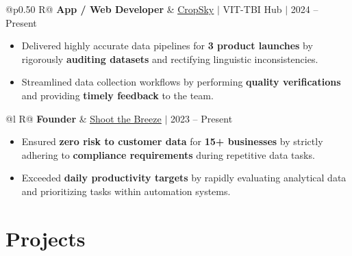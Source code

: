 \documentclass[a4paper,10pt]{article}
\newcommand{\ulink}[2]{\href{#1}{\uline{#2}}}
\newcommand{\subheading}[1]{{\color[HTML]{0A0A0A}\fontsize{12}{14}\selectfont\bfseries #1}}
\newcommand{\meta}[1]{{\color[HTML]{5C5C5C}\fontsize{10.5}{12.5}\selectfont #1}}
\begin{document}
\begin{tabularx}{\linewidth}{@{}p{0.50\linewidth} R@{}}
\subheading{App / Web Developer} & \meta{\ulink{https://sites.google.com/view/cropsky/home}{CropSky} $|$ VIT-TBI Hub $|$ 2024 -- Present}
\end{tabularx}
\begin{itemize}[nosep, leftmargin=1.5em, itemsep=1pt, topsep=2pt]
  \item {\color[HTML]{0A0A0A}\fontsize{11}{14}\selectfont Delivered highly accurate data pipelines for \textbf{3 product launches} by rigorously \textbf{auditing datasets} and rectifying linguistic inconsistencies.}
  \item {\color[HTML]{0A0A0A}\fontsize{11}{14}\selectfont Streamlined data collection workflows by performing \textbf{quality verifications} and providing \textbf{timely feedback} to the team.}
\end{itemize}

\vspace{1pt}

\begin{tabularx}{\linewidth}{@{}l R@{}}
\subheading{Founder} & \meta{\ulink{https://shoot-the-breeze.vercel.app}{Shoot the Breeze} $|$ 2023 -- Present}
\end{tabularx}
\begin{itemize}[nosep, leftmargin=1.5em, itemsep=1pt, topsep=2pt]
  \item {\color[HTML]{0A0A0A}\fontsize{11}{14}\selectfont Ensured \textbf{zero risk to customer data} for \textbf{15+ businesses} by strictly adhering to \textbf{compliance requirements} during repetitive data tasks.}
  \item {\color[HTML]{0A0A0A}\fontsize{11}{14}\selectfont Exceeded \textbf{daily productivity targets} by rapidly evaluating analytical data and prioritizing tasks within automation systems.}
\end{itemize}

\vspace{1pt}

\section{Projects}
\vspace{1pt}
\end{document}
